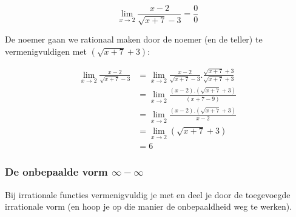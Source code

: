 \begin{itemize}
\begin{voorbeeld}
	\begin{equation*}
{\displaystyle {\displaystyle \lim_{x\to2}}\frac{x-2}{\sqrt{x+7}-3}=\frac{0}{0}}
\end{equation*}

De noemer gaan we rationaal maken door de noemer (en de teller) te
vermenigvuldigen met $\left(\sqrt{x+7}+3\right)$:

\begin{equation*}
\begin{array}{cl}
{\displaystyle {\displaystyle \lim_{x\to2}}\frac{x-2}{\sqrt{x+7}-3}} & {\displaystyle ={\displaystyle \lim_{x\to2}}\frac{x-2}{\sqrt{x+7}-3}.\frac{\sqrt{x+7}+3}{\sqrt{x+7}+3}}\\
& {\displaystyle ={\displaystyle \lim_{x\to2}}\frac{\left(x-2\right).\left(\sqrt{x+7}+3\right)}{\left(x+7-9\right)}}\\
& {\displaystyle ={\displaystyle \lim_{x\to2}}\frac{\left(x-2\right).\left(\sqrt{x+7}+3\right)}{x-2}}\\
& {\displaystyle ={\displaystyle \lim_{x\to2}}\left(\sqrt{x+7}+3\right)}\\
& =6
\end{array}
\end{equation*}
\end{voorbeeld}

\end{itemize}


\subsubsection{De onbepaalde vorm $\infty-\infty$}

Bij irrationale functies vermenigvuldig je met en deel je door de
toegevoegde irrationale vorm (en hoop je op die manier de onbepaaldheid
weg te werken).

